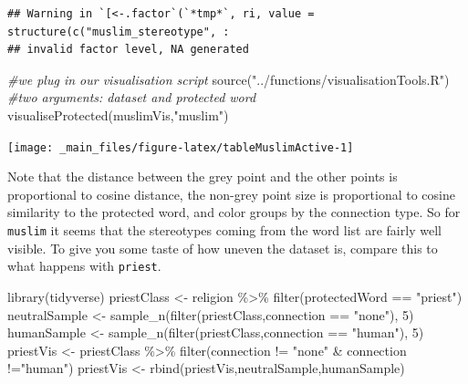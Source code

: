 \documentclass[
  12pt,
]{book}
\newenvironment{Shaded}{\begin{snugshade}}{\end{snugshade}}
\newcommand{\CommentTok}[1]{\textcolor[rgb]{0.56,0.35,0.01}{\textit{#1}}}
\newcommand{\DecValTok}[1]{\textcolor[rgb]{0.00,0.00,0.81}{#1}}
\newcommand{\FunctionTok}[1]{\textcolor[rgb]{0.00,0.00,0.00}{#1}}
\newcommand{\NormalTok}[1]{#1}
\newcommand{\OtherTok}[1]{\textcolor[rgb]{0.56,0.35,0.01}{#1}}
\newcommand{\SpecialCharTok}[1]{\textcolor[rgb]{0.00,0.00,0.00}{#1}}
\newcommand{\StringTok}[1]{\textcolor[rgb]{0.31,0.60,0.02}{#1}}
\begin{document}
\begin{verbatim}
## Warning in `[<-.factor`(`*tmp*`, ri, value = structure(c("muslim_stereotype", :
## invalid factor level, NA generated
\end{verbatim}

\begin{Shaded}
\begin{Highlighting}[]
\CommentTok{\#we plug in our visualisation script}
\FunctionTok{source}\NormalTok{(}\StringTok{"../functions/visualisationTools.R"}\NormalTok{)}
\CommentTok{\#two arguments: dataset and protected word}
\FunctionTok{visualiseProtected}\NormalTok{(muslimVis,}\StringTok{"muslim"}\NormalTok{)}
\end{Highlighting}
\end{Shaded}

\begin{center}\texttt{[image: \_main\_files/figure-latex/tableMuslimActive-1]} \end{center}
\normalsize

Note that the distance between the grey point and the other points is proportional to cosine distance, the non-grey point size is proportional to cosine similarity to the protected word, and color groups by the connection type. So for \texttt{muslim} it seems that the stereotypes coming from the word list are fairly well visible. To give you some taste of how uneven the dataset is, compare this to what happens with \texttt{priest}.

\vspace{1mm}
\footnotesize

\begin{Shaded}
\begin{Highlighting}[]
\FunctionTok{library}\NormalTok{(tidyverse)}
\NormalTok{priestClass }\OtherTok{\textless{}{-}}\NormalTok{ religion }\SpecialCharTok{\%\textgreater{}\%} \FunctionTok{filter}\NormalTok{(protectedWord }\SpecialCharTok{==} \StringTok{"priest"}\NormalTok{)}
\NormalTok{neutralSample }\OtherTok{\textless{}{-}} \FunctionTok{sample\_n}\NormalTok{(}\FunctionTok{filter}\NormalTok{(priestClass,connection }\SpecialCharTok{==} \StringTok{"none"}\NormalTok{), }\DecValTok{5}\NormalTok{)}
\NormalTok{humanSample }\OtherTok{\textless{}{-}} \FunctionTok{sample\_n}\NormalTok{(}\FunctionTok{filter}\NormalTok{(priestClass,connection }\SpecialCharTok{==} \StringTok{"human"}\NormalTok{), }\DecValTok{5}\NormalTok{)}
\NormalTok{priestVis }\OtherTok{\textless{}{-}}\NormalTok{ priestClass }\SpecialCharTok{\%\textgreater{}\%} \FunctionTok{filter}\NormalTok{(connection }\SpecialCharTok{!=} \StringTok{"none"} \SpecialCharTok{\&}\NormalTok{ connection }\SpecialCharTok{!=}\StringTok{"human"}\NormalTok{)}
\NormalTok{priestVis }\OtherTok{\textless{}{-}} \FunctionTok{rbind}\NormalTok{(priestVis,neutralSample,humanSample)}
\end{Highlighting}
\end{Shaded}
\end{document}

